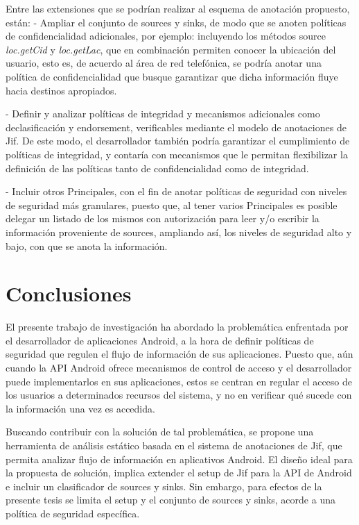 Entre las extensiones que se podrían realizar al esquema de anotación propuesto,
están:\newline 
- Ampliar el conjunto de sources y sinks, de modo que se anoten políticas de
confidencialidad adicionales, por ejemplo: incluyendo los métodos source
\emph{loc.getCid} y \emph{loc.getLac}, que en combinación permiten conocer la
ubicación del usuario, esto es, de acuerdo al área de red telefónica, se
podría anotar una política de confidencialidad que busque garantizar que dicha
información fluye hacia destinos apropiados.

- Definir y analizar políticas de integridad y mecanismos adicionales como
declasificación y endorsement, verificables mediante el modelo de anotaciones de
Jif. De este modo, el desarrollador también podría garantizar el cumplimiento de
políticas de integridad, y contaría con mecanismos que le permitan flexibilizar
la definición de las políticas tanto de confidencialidad como de integridad.

- Incluir otros Principales, con el fin de anotar políticas de seguridad con
niveles de seguridad más granulares, puesto que, al tener varios Principales
es posible delegar un listado de los mismos con autorización para leer y/o
escribir la información proveniente de sources, ampliando así, los niveles de
seguridad alto y bajo, con que se anota la información.

\section{Conclusiones}
\label{sec:conclu}
El presente trabajo de investigación ha abordado la problemática enfrentada por
el desarrollador de aplicaciones Android, a la hora de definir políticas de
seguridad que regulen el flujo de información de sus aplicaciones. Puesto que,
aún cuando la API Android ofrece mecanismos de control de acceso y el
desarrollador puede implementarlos en sus aplicaciones, estos se centran en
regular el acceso de los usuarios a determinados recursos del sistema, y no en
verificar qué sucede con la información una vez es accedida.

Buscando contribuir con la solución de tal problemática, se propone una
herramienta de análisis estático basada en el sistema de anotaciones de Jif, que
permita analizar flujo de información en aplicativos Android. El diseño ideal
para la propuesta de solución, implica extender el setup de Jif para la API de
Android e incluir un clasificador de sources y sinks. Sin embargo, para efectos
de la presente tesis se limita el setup y el conjunto de sources y sinks, acorde
a una política de seguridad específica.

